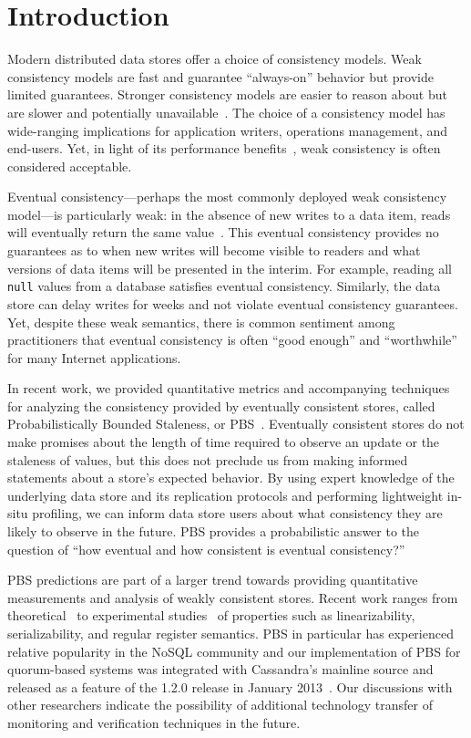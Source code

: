 \section{Introduction}

Modern distributed data stores offer a choice of consistency
models. Weak consistency models are fast and guarantee ``always-on''
behavior but provide limited guarantees. Stronger consistency models
are easier to reason about but are slower and potentially
unavailable~\cite{davidson-survey}. The choice of a consistency model
has wide-ranging implications for application writers, operations
management, and end-users.  Yet, in light of its performance
benefits~\cite{abadi-pacelc}, weak consistency is often considered
acceptable.

Eventual consistency---perhaps the most commonly deployed weak
consistency model---is particularly weak: in the absence of new writes
to a data item, reads will eventually return the same
value~\cite{vogels-defs}. This eventual consistency provides no
guarantees as to when new writes will become visible to readers and
what versions of data items will be presented in the
interim. For example, reading all \texttt{null}
values from a database satisfies eventual consistency. Similarly, the
data store can delay writes for weeks and not violate eventual
consistency guarantees. Yet, despite these weak semantics, there is
common sentiment among practitioners that eventual consistency is
often ``good enough'' and ``worthwhile'' for many Internet
applications.

In recent work, we provided quantitative metrics and accompanying
techniques for analyzing the consistency provided by eventually
consistent stores, called Probabilistically Bounded Staleness, or
PBS~\cite{pbs-vldb2012}. Eventually consistent stores do not make
promises about the length of time required to observe an update or the
staleness of values, but this does not preclude us from making
informed statements about a store's expected behavior. By using expert
knowledge of the underlying data store and its replication protocols
and performing lightweight in-situ profiling, we can inform data store
users about what consistency they are likely to observe in the
future. PBS provides a probabilistic answer to the question of
``how eventual and how consistent is eventual consistency?''

PBS predictions are part of a larger trend towards providing
quantitative measurements and analysis of weakly consistent
stores. Recent work ranges from theoretical~\cite{podc-hpl} to
experimental studies~\cite{hotdep} of properties such as linearizability,
serializability, and regular register semantics. PBS in particular has
experienced relative popularity in the NoSQL community and our
implementation of PBS for quorum-based systems was integrated with
Cassandra's mainline source and released as a feature of the 1.2.0
release in January 2013~\cite{cassandra-pbs-patch}. Our discussions
with other researchers indicate the possibility of additional
technology transfer of monitoring and verification techniques in the
future.


